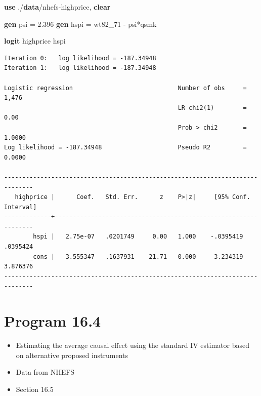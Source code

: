 \documentclass[
  10pt,
]{book}
\newenvironment{Shaded}{\begin{snugshade}}{\end{snugshade}}
\newcommand{\KeywordTok}[1]{\textcolor[rgb]{0.13,0.29,0.53}{\textbf{#1}}}
\newcommand{\NormalTok}[1]{#1}
\providecommand{\tightlist}{%
  \setlength{\itemsep}{0pt}\setlength{\parskip}{0pt}}
\begin{document}
\begin{Shaded}
\begin{Highlighting}[]
\KeywordTok{use}\NormalTok{ ./}\KeywordTok{data}\NormalTok{/nhefs{-}highprice, }\KeywordTok{clear}

\KeywordTok{gen}\NormalTok{ psi = 2.396}
\KeywordTok{gen}\NormalTok{ hspi = wt82\_71 {-} psi*qsmk}

\KeywordTok{logit}\NormalTok{ highprice hspi}
\end{Highlighting}
\end{Shaded}

\begin{verbatim}
Iteration 0:   log likelihood = -187.34948  
Iteration 1:   log likelihood = -187.34948  

Logistic regression                             Number of obs     =      1,476
                                                LR chi2(1)        =       0.00
                                                Prob > chi2       =     1.0000
Log likelihood = -187.34948                     Pseudo R2         =     0.0000

------------------------------------------------------------------------------
   highprice |      Coef.   Std. Err.      z    P>|z|     [95% Conf. Interval]
-------------+----------------------------------------------------------------
        hspi |   2.75e-07   .0201749     0.00   1.000    -.0395419    .0395424
       _cons |   3.555347   .1637931    21.71   0.000     3.234319    3.876376
------------------------------------------------------------------------------
\end{verbatim}

\hypertarget{program-16.4-1}{%
\section{Program 16.4}\label{program-16.4-1}}

\begin{itemize}
\tightlist
\item
  Estimating the average causal effect using the standard IV estimator based on alternative proposed instruments
\item
  Data from NHEFS
\item
  Section 16.5
\end{itemize}
\end{document}
